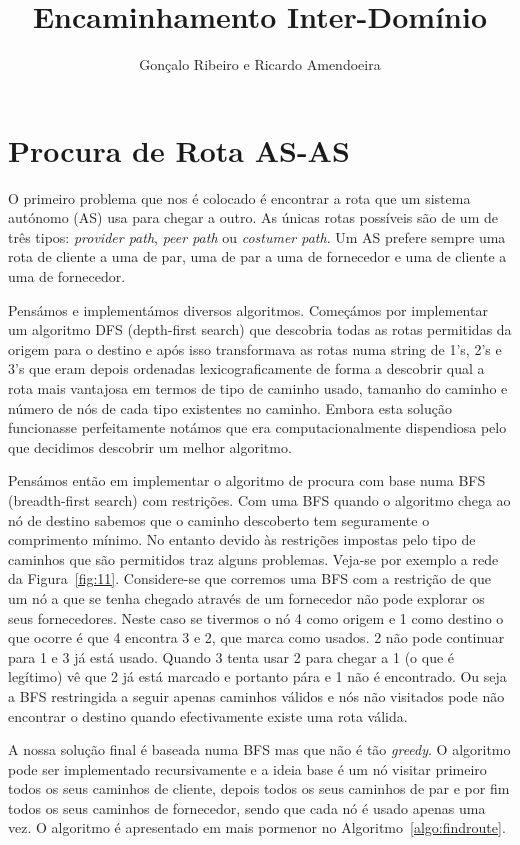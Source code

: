 \documentclass[10pt,a4paper]{article}
\author{Gonçalo Ribeiro e Ricardo Amendoeira}
\title{Encaminhamento Inter-Domínio}
\begin{document}

\pagebreak

\section{Procura de Rota AS-AS}
O primeiro problema que nos é colocado é encontrar a rota que um sistema autónomo (AS) usa para chegar a outro. As únicas rotas possíveis são de um de três tipos: \textit{provider path}, \textit{peer path} ou \textit{costumer path}. Um AS prefere sempre uma rota de cliente a uma de par, uma de par a uma de fornecedor e uma de cliente a uma de fornecedor.

Pensámos e implementámos diversos algoritmos. Começámos por implementar um algoritmo DFS (depth-first search) que descobria todas as rotas permitidas da origem para o destino e após isso transformava as rotas numa string de 1's, 2's e 3's que eram depois ordenadas lexicograficamente de forma a descobrir qual a rota mais vantajosa em termos de tipo de caminho usado, tamanho do caminho e número de nós de cada tipo existentes no caminho. Embora esta solução funcionasse perfeitamente notámos que era computacionalmente dispendiosa pelo que decidimos descobrir um melhor algoritmo.

Pensámos então em implementar o algoritmo de procura com base numa BFS (breadth-first search) com restrições. Com uma BFS quando o algoritmo chega ao nó de destino sabemos que o caminho descoberto tem seguramente o comprimento mínimo. No entanto devido às restrições impostas pelo tipo de caminhos que são permitidos traz alguns problemas. Veja-se por exemplo a rede da Figura~\ref{fig:11}. Considere-se que corremos uma BFS com a restrição de que um nó a que se tenha chegado através de um fornecedor não pode explorar os seus fornecedores. Neste caso se tivermos o nó 4 como origem e 1 como destino o que ocorre é que 4 encontra 3 e 2, que marca como usados. 2 não pode continuar para 1 e 3 já está usado. Quando 3 tenta usar 2 para chegar a 1 (o que é legítimo) vê que 2 já está marcado e portanto pára e 1 não é encontrado. Ou seja a BFS restringida a seguir apenas caminhos válidos e nós não visitados pode não encontrar o destino quando efectivamente existe uma rota válida.

A nossa solução final é baseada numa BFS mas que não é tão \textit{greedy}. O algoritmo pode ser implementado recursivamente e a ideia base é um nó visitar primeiro todos os seus caminhos de cliente, depois todos os seus caminhos de par e por fim todos os seus caminhos de fornecedor, sendo que cada nó é usado apenas uma vez. O algoritmo é apresentado em mais pormenor no Algoritmo~\ref{algo:findroute}.
\end{document}
